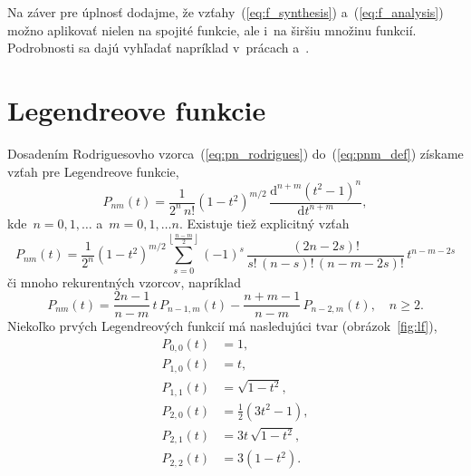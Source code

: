 \documentclass[a4paper, 12pt]{book}
\newcommand{\diff}{\mathrm d}
\begin{document}
Na záver pre úplnosť dodajme, že vzťahy~(\ref{eq:f_synthesis}) 
a~(\ref{eq:f_analysis}) možno aplikovať nielen na spojité funkcie, ale i~na 
širšiu množinu funkcií.  Podrobnosti sa dajú vyhľadať napríklad v~prácach 
\textcite{Freeden2009} a~\textcite{Arfken2005}.






\section{Legendreove funkcie}
\label{sec:legendre_functions}

Dosadením Rodriguesovho vzorca~(\ref{eq:pn_rodrigues}) do~(\ref{eq:pnm_def})
získame vzťah pre Legendreove funkcie,
%
\begin{equation}
\label{eq:pnm_ferrer}
P_{nm}(t) = \frac{1}{2^n \, n!} (1 - t^2)^{ m \slash 2} \, \frac{\diff^{n + m}
(t^2 - 1)^n}{\diff t^{n + m}}{,}
\end{equation}
%
kde~$n = 0, 1, \dots$ a~$m = 0, 1, \dots n$.  Existuje tiež explicitný vzťah 
\parencite{Freeden2009}
%
\begin{equation}
P_{nm}(t) = \frac{1}{2^n}(1 - t^2)^{m \slash 2} \sum_{s = 0}^{\left\lfloor
\frac{n - m}{2} \right\rfloor} (-1)^s \, \frac{(2n - 2s)!}{s! \, (n - s)! \, (n
- m - 2s)!} \, t^{n - m - 2s}
\end{equation}
%
či mnoho rekurentných vzorcov, napríklad \parencite{Freeden2009}
%
\begin{equation}
\label{eq:pnm_recurrence}
P_{nm}(t) = \frac{2n - 1}{n - m} \, t \, P_{n - 1, m}(t) - \frac{n + m - 1}{n
- m} \, P_{n - 2, m}(t){,} \quad n \geq 2{.}
\end{equation}
%
Niekoľko prvých Legendreových funkcií má nasledujúci tvar 
(obrázok~\ref{fig:lf}),
%
\begin{equation}
\label{eq:lf00_to_lf22}
\begin{split}
P_{0,0}(t) & = 1{,}\\
P_{1,0}(t) & = t{,}\\
P_{1,1}(t) & = \sqrt{1 - t^2}{,}\\
P_{2,0}(t) & = \frac{1}{2}(3t^2 - 1){,}\\
P_{2,1}(t) & = 3t \, \sqrt{1 - t^2}{,}\\
P_{2,2}(t) & = 3(1 - t^2){.}\\
\end{split}
\end{equation}
\end{document}
